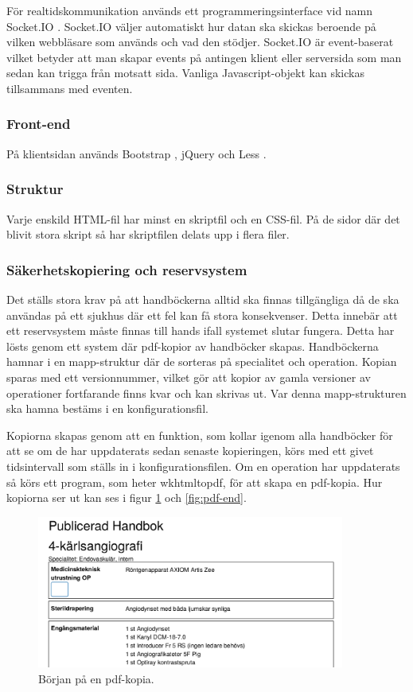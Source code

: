 För realtidskommunikation används ett programmeringsinterface vid namn Socket.IO \cite{socketio}.
Socket.IO väljer automatiskt hur datan ska skickas beroende på vilken webbläsare som används och vad den stödjer.
Socket.IO är event-baserat vilket betyder att man skapar events på antingen klient eller serversida som man sedan kan trigga från motsatt sida.
Vanliga Javascript-objekt kan skickas tillsammans med eventen.

\subsubsection{Front-end}
På klientsidan används Bootstrap \cite{bootstrap}, jQuery \cite{jquery} och Less \cite{less}.

\subsubsection{Struktur}
Varje enskild HTML-fil har minst en skriptfil och en CSS-fil. På de sidor där det blivit stora skript så har skriptfilen delats upp i flera filer.

\subsubsection{Säkerhetskopiering och reservsystem}
Det ställs stora krav på att handböckerna alltid ska finnas tillgängliga då de ska användas på ett sjukhus där ett fel kan få stora konsekvenser. Detta innebär att ett reservsystem måste finnas till hands ifall systemet slutar fungera. Detta har lösts genom ett system där pdf-kopior av handböcker skapas. Handböckerna hamnar i en mapp-struktur där de sorteras på specialitet och operation. Kopian sparas med ett versionnummer, vilket gör att kopior av gamla versioner av operationer fortfarande finns kvar och kan skrivas ut. Var denna mapp-strukturen ska hamna bestäms i en konfigurationsfil.

Kopiorna skapas genom att en funktion, som kollar igenom alla handböcker för att se om de har uppdaterats sedan senaste kopieringen, körs med ett givet tidsintervall som ställs in i konfigurationsfilen. Om en operation har uppdaterats så körs ett program, som heter wkhtmltopdf, för att skapa en pdf-kopia. Hur kopiorna ser ut kan ses i figur \ref{fig:pdf-start} och \ref{fig:pdf-end}.

\begin{figure}
  \centering
  \includegraphics[width=0.9\textwidth]{images/pdf-start.png}
  \caption{Början på en pdf-kopia.}
  \label{fig:pdf-start}
\end{figure}

